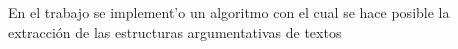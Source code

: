 \begin{conclusions}


En el trabajo se implement'o un algoritmo con el cual se hace posible la extracción de las estructuras
argumentativas de textos 


\end{conclusions}
